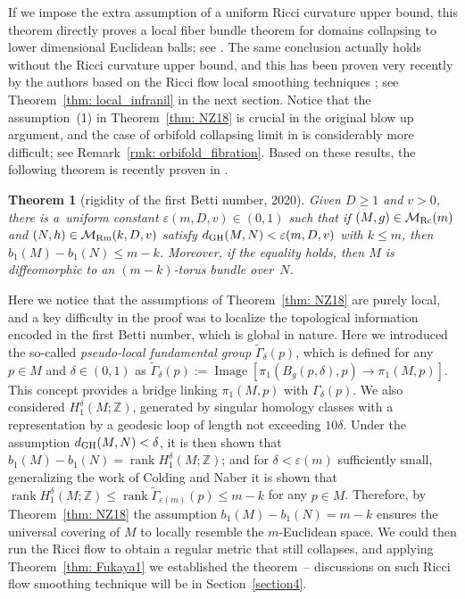 \documentclass[10pt,a4paper]{amsart}
\numberwithin{equation}{section}
\newtheorem{Theorem}{Theorem}[section]
\newcommand{\rank}{\operatorname{rank}}
\begin{document}
If we impose the extra assumption of a uniform Ricci curvature upper bound, this
theorem directly proves a local fiber bundle theorem for domains collapsing to
lower dimensional Euclidean balls; see \cite[Proposition~6.6]{NaberZhang}. The
same conclusion actually holds without the Ricci curvature upper bound, and this
has been proven very recently by the authors based on the Ricci flow local
smoothing techniques \cite[Theorem~1.4]{HW20b}; see Theorem~\ref{thm:
local_infranil} in the next section. Notice that the assumption~(1) in
Theorem~\ref{thm: NZ18} is crucial in the original blow up argument, and the
case of orbifold collapsing limit in \cite[Theorem 1.4]{HW20b} is considerably
more difficult; see Remark~\ref{rmk: orbifold_fibration}. Based on these
results, the following theorem is recently proven in \cite{HW20a}.
\begin{Theorem}[rigidity of the first Betti number, 2020]\label{thm: HW20a}
Given $D\ge 1$ and $v>0$, there is a~uniform constant $\varepsilon(m,D,v)\in
(0,1)$ such that if $(M,g)\in \mathcal{M}_{\rm Rc}(m)$ and $(N,h)\in
\mathcal{M}_{\rm Rm}(k,D,v)$ satisfy $d_{\rm GH}(M,N)<\varepsilon(m,D,v)$ with $k\le
m$, then $b_1(M)-b_1(N)\le m-k$. Moreover, if the equality holds, then $M$ is
diffeomorphic to an $(m-k)$-torus bundle over~$N$.
\end{Theorem}
Here we notice that the assumptions of Theorem~\ref{thm: NZ18} are purely local,
and a key difficulty in the proof was to localize the topological information
encoded in the first Betti number, which is global in nature. Here we
introduced the so-called \emph{pseudo-local fundamental group}
$\tilde{\Gamma}_{\delta}(p)$, which is defined for any $p\in M$ and $\delta\in
(0,1)$ as $\tilde{\Gamma}_{\delta}(p) :=\operatorname{Image}\left[\pi_1(B_g(p,\delta),p)\to
\pi_1(M,p)\right]$. This concept provides a bridge linking $\pi_1(M,p)$ with
$\Gamma_{\delta}(p)$. We also considered $H_1^{\delta}(M; \mathbb{Z})$,
generated by singular homology classes with a representation by a geodesic loop
of length not exceeding $10\delta$. Under the assumption $d_{\rm GH}(M,N)<\delta$,
it is then shown that $b_1(M)-b_1(N)=\rank H_1^{\delta}(M;\mathbb{Z})$; and
for $\delta<\varepsilon(m)$ sufficiently small, generalizing the work of
Colding and Naber \cite{CN12} it is shown that $\rank H_1^{\delta}
(M;\mathbb{Z})\le \rank \tilde{\Gamma}_{\varepsilon(m)}(p)\le m-k$ for any
$p\in M$. Therefore, by Theorem~\ref{thm: NZ18} the assumption
$b_1(M)-b_1(N)=m-k$ ensures the universal covering of $M$ to locally resemble
the $m$-Euclidean space. We could then run the Ricci flow to obtain a regular
metric that still collapses, and applying Theorem~\ref{thm: Fukaya1} we
established the theorem~-- discussions on such Ricci flow smoothing technique
will be in Section~\ref{section4}.
\end{document}

